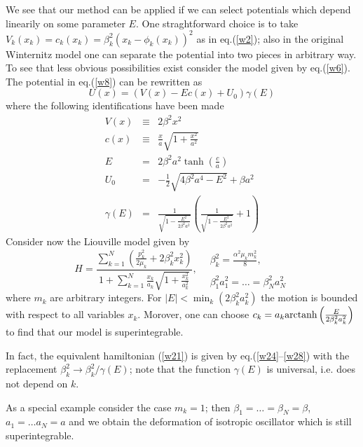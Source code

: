 \documentclass[a4paper,12pt]{article}
\newcommand{\arctanh}{\mbox{\rm arctanh}}
\begin{document}
We see that our method can be applied if we can select potentials which depend linearily on some parameter
$E$. One straghtforward choice is to take
 $V_k(x_k)=c_k(x_k)=\beta^2_k(x_k-\phi_k(x_k))^2$
as in eq.(\ref{w2}); also in the original Winternitz model one can separate
the potential into two pieces in arbitrary way.
To see that less obvious possibilities exist consider the model given by eq.(\ref{w6}). The 
potential in eq.(\ref{w8}) can be rewritten as 
\begin{equation}
U(x)=(V(x)-Ec(x)+U_0)\gamma(E)
\label{w23}
\end{equation}
where the following identifications have been made
\begin{eqnarray}
V(x)&\equiv&2\beta^2x^2 \label{w24}\\
c(x)&\equiv&\frac{x}{a}\sqrt{1+\frac{x^2}{a^2}}\label{w25}\\
E&=&2\beta^2 a^2\tanh\left(\frac{c}{a}\right)\label{w26}\\
U_0&=&-\frac{1}{2}\sqrt{4\beta^2a^4-E^2}+\beta a^2\label{w27}\\
\gamma(E)&=&
\frac{\displaystyle 1}{\displaystyle \sqrt{1-\frac{E^2}{2\beta^2a^2}}}
\left(
\frac{\displaystyle 1}{\displaystyle \sqrt{1-\frac{E^2}{2\beta^2a^2}}}+1\right)\label{w28}
\end{eqnarray}
Consider now the Liouville model given by
\begin{equation}
H=\frac{\displaystyle \sum_{k=1}^N\left(\frac{p_k^2}{2\mu_k}+2\beta_k^2x_k^2\right)}{
\displaystyle 1+\sum_{k=1}^N\frac{x_k}{a_k}\sqrt{1+\frac{x_k^2}{a_k^2}}}, \ \ \ \ 
\begin{array}{l}
\displaystyle\beta_k^2=\frac{\alpha^2\mu_km_k^2}{8},\\
\\
\displaystyle\beta_1^2a_1^2=\ldots=\beta_N^2a_N^2
\end{array}
\label{w29}
\end{equation}
where $m_k$ are arbitrary integers. For $|E|<\min_k(2\beta_k^2a_k^2)$ the motion is bounded with
respect to all variables $x_k$. Morover, one can choose 
$c_k=a_k\arctanh\left(\frac{E}{2\beta_k^2a_k^2}\right)$ to find that our model is superintegrable.

In fact, the equivalent hamiltonian (\ref{w21}) is given by eq.(\ref{w24}--\ref{w28}) with the replacement 
$\beta_k^2\rightarrow\beta_k^2/\gamma(E)$; note that the function $\gamma(E)$ is
universal, i.e. does not depend on $k$.

As a special example consider the case $m_k=1$; then $\beta_1=\ldots=\beta_N=\beta$, 
$a_1=\ldots a_N=a$ and we obtain the deformation of isotropic oscillator which is still superintegrable.
\end{document}
